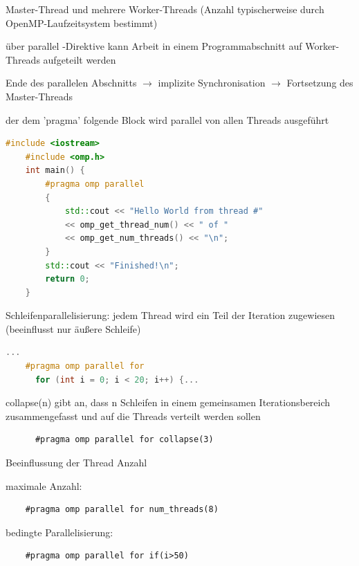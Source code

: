 \documentclass[10pt]{article}
\begin{document}
\begin{itemize*}
  \item Master-Thread und mehrere Worker-Threads (Anzahl typischerweise durch OpenMP-Laufzeitsystem bestimmt)
  \item über parallel -Direktive kann Arbeit in einem Programmabschnitt auf Worker-Threads aufgeteilt werden
  \item Ende des parallelen Abschnitts $\rightarrow$ implizite Synchronisation $\rightarrow$ Fortsetzung des Master-Threads
  \item der dem 'pragma' folgende Block wird parallel von allen Threads ausgeführt
  \begin{lstlisting}[language=C++]
    #include <iostream>
    #include <omp.h>
    int main() {
        #pragma omp parallel
        {
            std::cout << "Hello World from thread #"
            << omp_get_thread_num() << " of "
            << omp_get_num_threads() << "\n";
        }
        std::cout << "Finished!\n";
        return 0;
    }
    \end{lstlisting}
  \item Schleifenparallelisierung: jedem Thread wird ein Teil der Iteration zugewiesen (beeinflusst nur äußere Schleife)
  \begin{lstlisting}[language=C++]
    ...
    #pragma omp parallel for
      for (int i = 0; i < 20; i++) {...
    \end{lstlisting}
  \begin{itemize*}
    \item collapse(n) gibt an, dass n Schleifen in einem gemeinsamen Iterationsbereich zusammengefasst und auf die Threads verteilt werden sollen
    \begin{lstlisting}
      #pragma omp parallel for collapse(3)
      \end{lstlisting}
  \end{itemize*}
  \item Beeinflussung der Thread Anzahl
  \begin{itemize*}
    \item maximale Anzahl:
    \begin{lstlisting}
    #pragma omp parallel for num_threads(8)
    \end{lstlisting}
    \item bedingte Parallelisierung:
    \begin{lstlisting}
    #pragma omp parallel for if(i>50)
    \end{lstlisting}
  \end{itemize*}

\end{itemize*}
\end{document}
